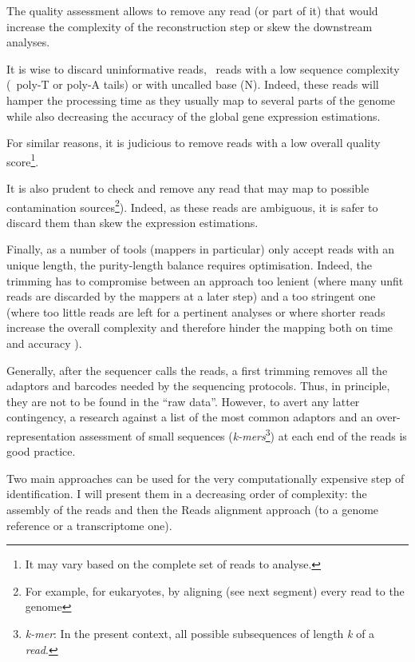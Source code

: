\label{minisec:trim}

The quality assessment allows to remove any read (or part of it) that would
increase the complexity of the reconstruction step or skew the downstream analyses.

It is wise to discard uninformative reads, \ie\
reads with a low sequence complexity (\eg\ poly-T or poly-A tails) or with
uncalled base (N). Indeed, these reads will hamper the processing time as they
usually map to several parts of the genome while also decreasing the accuracy of
the global gene expression estimations.

For similar reasons, it is judicious to remove reads with a low overall quality
score\footnote{It may vary based on the complete set of reads to analyse.}.

It is also prudent to check and remove any read that may map to possible
contamination sources\footnote{For example, for eukaryotes, by aligning (see next
segment) every read to the \species{Escherichia coli} genome}).
Indeed, as these reads are ambiguous, it is safer
to discard them than skew the expression estimations.

Finally, as a number of tools (mappers in particular) only accept reads
with an unique length, the purity-length balance requires optimisation.
Indeed, the trimming has to compromise between
an approach too lenient (where many unfit reads are discarded
by the mappers at a later step) and
a too stringent one (where too little reads are left for a pertinent analyses or
where shorter reads increase the overall complexity and therefore hinder
the mapping both on time and accuracy \mycite{Trimwisely}).

\NB Generally, after the sequencer calls the reads, a first trimming removes
all the adaptors and barcodes needed by the sequencing protocols. Thus,
in principle, they are not to be found in the ``raw data''.
However, to avert any latter contingency, a research against
a list of the most common adaptors and an over-representation assessment of small
sequences (\emph{k-mers}\footnote{\emph{k-mer}: In the present context, all
possible subsequences of length
\emph{k} of a \emph{read}.}) at each end of the reads is good practice.



Two main approaches can be used for the very computationally expensive step of
identification. I will present them in a decreasing order of complexity:
the \latin{de novo} assembly of the reads and then the Reads alignment approach
(to a genome reference or a transcriptome one).

